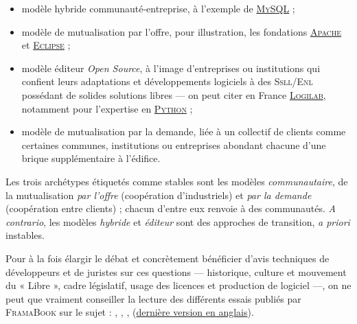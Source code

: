 \begin{itemize}
{}{Note de la rédaction}
	\item modèle hybride communauté-entreprise, à l'exemple de \href{https://www.mysql.com/fr/}{\textsc{MySQL}} ;
	\item modèle de mutualisation par l'offre, pour illustration, les fondations \href{https://www.apache.org/}{\textsc{Apache}} et \href{https://www.eclipse.org/}{\textsc{Eclipse}} ;
	\item modèle éditeur \textit{Open Source}, à l'image d'entreprises ou institutions qui confient leurs adaptations et développements logiciels à des \textsc{Ssll/Enl} possédant de solides solutions libres --- on peut citer en France \href{https://www.logilab.fr/}{\textsc{Logilab}}, notamment pour l'expertise en \href{https://www.python.org/}{\textsc{Python}} ;
	\item modèle de mutualisation par la demande, liée à un collectif de clients comme certaines communes, institutions ou entreprises abondant chacune d'une brique supplémentaire à l'édifice.
\end{itemize}
Les trois archétypes étiquetés comme stables sont les modèles \emph{communautaire}, de la mutualisation \emph{par l'offre} (coopération d'industriels) et \emph{par la demande} (coopération entre clients) ; chacun d'entre eux renvoie à des communautés. \textit{A contrario}, les modèles \emph{hybride} et \emph{éditeur} sont des approches de transition, \textit{a priori} instables.

Pour à la fois élargir le débat et concrètement bénéficier d'avis techniques de développeurs et de juristes sur ces questions --- historique, culture et mouvement du « Libre », cadre législatif, usage des licences et production de logiciel ---, on ne peut que vraiment conseiller la lecture des différents essais publiés par \textsc{FramaBook} sur le sujet : 
 \parencite{Paloque-Berges-Masutti:2013},  \parencite{Pintscheretal:2013},  \parencite{Jean:2011},  \parencite{Fogel:2012} (\href{https://producingoss.com/}{dernière version en anglais}).

